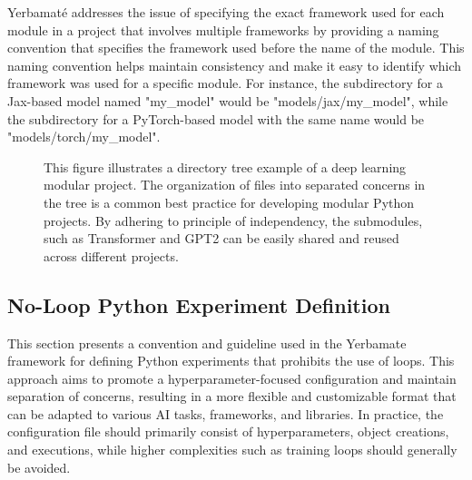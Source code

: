 Yerbamaté addresses the issue of specifying the exact framework used for each module in a project that involves multiple frameworks by providing a naming convention that specifies the framework used before the name of the module. This naming convention helps maintain consistency and make it easy to identify which framework was used for a specific module. For instance, the subdirectory for a Jax-based model named "my\_model" would be "models/jax/my\_model", while the subdirectory for a PyTorch-based model with the same name would be "models/torch/my\_model".




\begin{figure}
\centering
{}
\caption{
This figure illustrates a directory tree example of a deep learning modular project. The organization of files into separated concerns in the tree is a common best practice for developing modular Python projects. By adhering to principle of independency, the submodules, such as Transformer and GPT2 can be easily shared and reused across different projects. 
}
\end{figure}



\subsection{No-Loop Python Experiment Definition}

This section presents a convention and guideline used in the Yerbamate framework for defining Python experiments that prohibits the use of loops. This approach aims to promote a hyperparameter-focused configuration and maintain separation of concerns, resulting in a more flexible and customizable format that can be adapted to various AI tasks, frameworks, and libraries. In practice, the configuration file should primarily consist of hyperparameters, object creations, and executions, while higher complexities such as training loops should generally be avoided.






